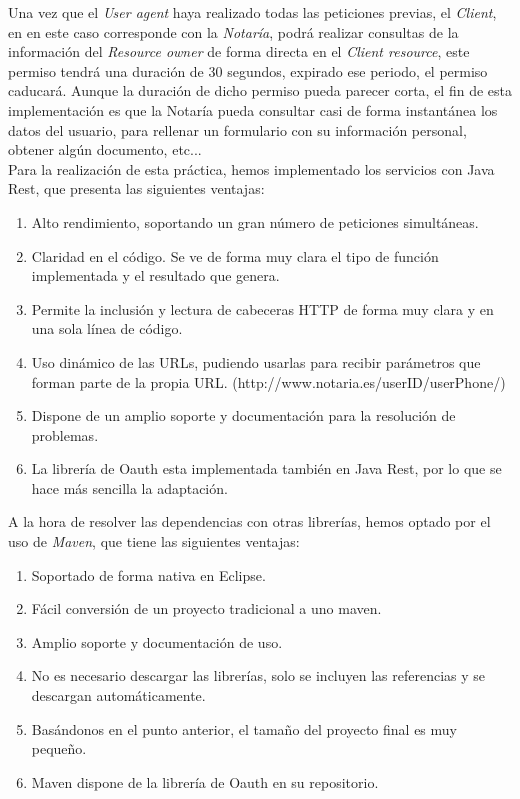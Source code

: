 \documentclass[a4,12pt,onecolum]{article}
\begin{document}
Una vez que el \emph{User agent} haya realizado todas las peticiones previas, el \emph{Client}, en en este caso corresponde con la \emph{Notaría}, podrá realizar consultas de la información del \emph{Resource owner} de forma directa en el \emph{Client resource}, este permiso tendrá una duración de 30 segundos, expirado ese periodo, el permiso caducará. Aunque la duración de dicho permiso pueda parecer corta, el fin de esta implementación es que la Notaría pueda consultar casi de forma instantánea los datos del usuario, para rellenar  un formulario con su información personal, obtener algún documento, etc... \\

Para la realización de esta práctica, hemos implementado los servicios con Java Rest, que presenta las siguientes ventajas:
\begin{enumerate}
	\item Alto rendimiento, soportando un gran número de peticiones simultáneas.
	\item Claridad en el código. Se ve de forma muy clara el tipo de función implementada y el resultado que 		genera.
	\item Permite la inclusión y lectura de cabeceras HTTP de forma muy clara y en una sola línea de código.
	\item Uso dinámico de las URLs, pudiendo usarlas para recibir parámetros que forman parte de la propia URL. 	(http://www.notaria.es/{userID}/{userPhone}/)
	\item Dispone de un amplio soporte y documentación para la resolución de problemas.
	\item La librería de Oauth esta implementada también en Java Rest, por lo que se hace más sencilla la 			adaptación. \\
\end{enumerate}

A la hora de resolver las dependencias con otras librerías, hemos optado por el uso de \emph{Maven}, que tiene las siguientes ventajas:
\begin{enumerate}
	\item Soportado de forma nativa en Eclipse.
	\item Fácil conversión de un proyecto tradicional a uno maven.
	\item Amplio soporte y documentación de uso.
	\item No es necesario descargar las librerías, solo se incluyen las referencias y se descargan 					automáticamente.
	\item Basándonos en el punto anterior, el tamaño del proyecto final es muy pequeño.
	\item Maven dispone de la librería de Oauth en su repositorio.
\end{enumerate}
\end{document}
